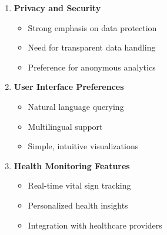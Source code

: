 \begin{enumerate}
    \item \textbf{Privacy and Security}
    \begin{itemize}
        \item Strong emphasis on data protection
        \item Need for transparent data handling
        \item Preference for anonymous analytics
    \end{itemize}

    \item \textbf{User Interface Preferences}
    \begin{itemize}
        \item Natural language querying
        \item Multilingual support
        \item Simple, intuitive visualizations
    \end{itemize}

    \item \textbf{Health Monitoring Features}
    \begin{itemize}
        \item Real-time vital sign tracking
        \item Personalized health insights
        \item Integration with healthcare providers
    \end{itemize}
\end{enumerate} 